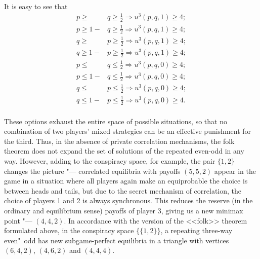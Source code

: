 It is easy to see that %
\begin{align*}
	p \ge &q \ge \frac{1}{2} \Rightarrow u^3(p, q, 1) \ge 4; \\
	p \ge 1 - &q \ge \frac{1}{2} \Rightarrow u^3(p, q, 1) \ge 4; \\
	q \ge &p \ge \frac{1}{2} \Rightarrow u^3(p, q, 1) \ge 4; \\
	q \ge 1 - &p \ge \frac{1}{2} \Rightarrow u^3(p, q, 1) \ge 4; \\
	p \le &q \le \frac{1}{2} \Rightarrow u^3(p, q, 0) \ge 4; \\
	p \le 1 - &q \le \frac{1}{2} \Rightarrow u^3(p, q, 0) \ge 4; \\
	q \le &p \le \frac{1}{2} \Rightarrow u^3(p, q, 0) \ge 4; \\
	q \le 1 - &p \le \frac{1}{2} \Rightarrow u^3(p, q, 0) \ge 4. \\
\end{align*}

These options exhaust the entire space of possible situations, so that no combination of two players' mixed strategies can be an effective punishment for the third. Thus, in the absence of private correlation mechanisms, the folk theorem does not expand the set of solutions of the repeated even-odd in any way. However, adding to the conspiracy space, for example, the pair $\{1, 2\}$ changes the picture "--- correlated equilibria with payoffs $(5, 5, 2)$ appear in the game in a situation where all players again make an equiprobable the choice is between heads and tails, but due to the secret mechanism of correlation, the choice of players 1 and 2 is always synchronous. This reduces the reserve (in the ordinary and equilibrium sense) payoffs of player 3, giving us a new minimax point "--- $(4, 4, 2)$. In accordance with the version of the <<folk>> theorem formulated above, in the conspiracy space $\{\{1, 2\}\}$, a repeating three-way even"~odd has new subgame-perfect equilibria in a triangle with vertices $(6, 4 , 2)$, $(4, 6, 2)$ and $(4, 4, 4)$. %

